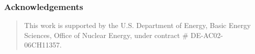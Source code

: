 
\begin{frame}[ctb!]
  \frametitle{Acknowledgements}  
  \begin{quote}
  This work is supported by the U.S. Department of Energy, Basic Energy 
  Sciences, Office of Nuclear Energy, under contract # DE-AC02-06CH11357.
\end{quote}
\end{frame}
